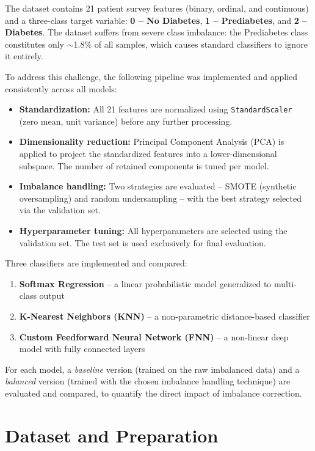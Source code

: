 \documentclass[12pt,a4paper]{article}
\begin{document}
The dataset contains 21 patient survey features (binary, ordinal, and continuous) and a three-class target variable: \textbf{0 -- No Diabetes}, \textbf{1 -- Prediabetes}, and \textbf{2 -- Diabetes}. The dataset suffers from severe class imbalance: the Prediabetes class constitutes only $\sim$1.8\% of all samples, which causes standard classifiers to ignore it entirely.

To address this challenge, the following pipeline was implemented and applied consistently across all models:
\begin{itemize}
    \item \textbf{Standardization:} All 21 features are normalized using \texttt{StandardScaler} (zero mean, unit variance) before any further processing.
    \item \textbf{Dimensionality reduction:} Principal Component Analysis (PCA) is applied to project the standardized features into a lower-dimensional subspace. The number of retained components is tuned per model.
    \item \textbf{Imbalance handling:} Two strategies are evaluated -- SMOTE (synthetic oversampling) and random undersampling -- with the best strategy selected via the validation set.
    \item \textbf{Hyperparameter tuning:} All hyperparameters are selected using the validation set. The test set is used exclusively for final evaluation.
\end{itemize}

Three classifiers are implemented and compared:
\begin{enumerate}[leftmargin=2cm]
    \item \textbf{Softmax Regression} -- a linear probabilistic model generalized to multi-class output
    \item \textbf{K-Nearest Neighbors (KNN)} -- a non-parametric distance-based classifier
    \item \textbf{Custom Feedforward Neural Network (FNN)} -- a non-linear deep model with fully connected layers
\end{enumerate}

For each model, a \textit{baseline} version (trained on the raw imbalanced data) and a \textit{balanced} version (trained with the chosen imbalance handling technique) are evaluated and compared, to quantify the direct impact of imbalance correction.

\section{Dataset and Preparation}
\end{document}
